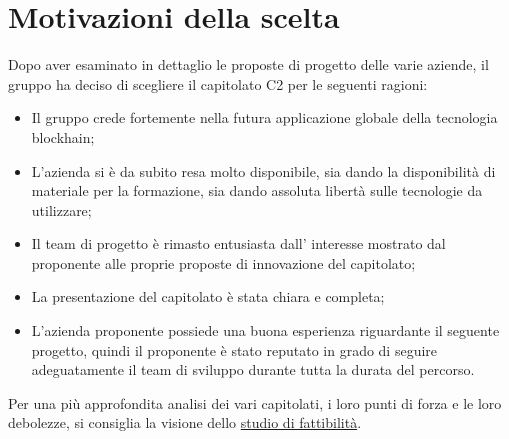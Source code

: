 \section{Motivazioni della scelta}\label{section:motivazioni}

Dopo aver esaminato in dettaglio le proposte di progetto delle varie aziende,
 il gruppo ha deciso di scegliere il capitolato C2 per le seguenti ragioni:
\begin{itemize}
    \item Il gruppo crede fortemente nella futura applicazione globale della tecnologia blockhain;
    \item L'azienda si è da subito resa molto disponibile, sia dando la disponibilità di materiale per la formazione, sia dando assoluta libertà sulle tecnologie da utilizzare;
    \item Il team di progetto è rimasto entusiasta dall' interesse mostrato dal proponente alle proprie proposte di innovazione del capitolato;
    \item La presentazione del capitolato è stata chiara e completa;
    \item L'azienda proponente possiede una buona esperienza riguardante il seguente progetto, quindi il proponente è stato reputato in grado di seguire adeguatamente il team di sviluppo durante tutta la durata del percorso.
\end{itemize}

Per una più approfondita analisi dei vari capitolati,
 i loro punti di forza e le loro debolezze, si consiglia la visione dello \href{https://yakuzaishi-swe.github.io/docs/docs/studio_fattibilita.pdf}{studio di fattibilità}.
